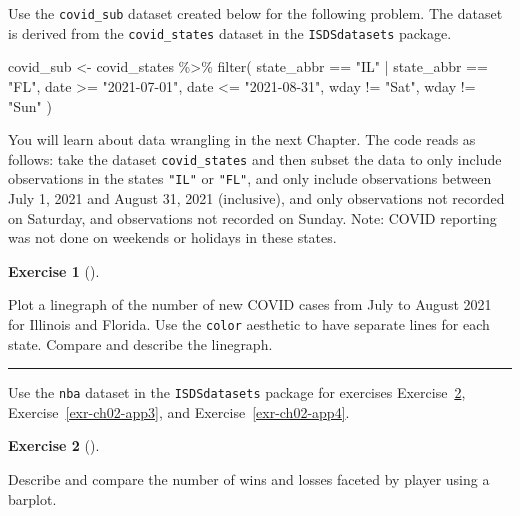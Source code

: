\documentclass[
  letterpaper,
  DIV=11,
  numbers=noendperiod]{scrreprt}
\newenvironment{Shaded}{\begin{snugshade}}{\end{snugshade}}
\newcommand{\FunctionTok}[1]{\textcolor[rgb]{0.28,0.35,0.67}{#1}}
\newcommand{\NormalTok}[1]{\textcolor[rgb]{0.00,0.23,0.31}{#1}}
\newcommand{\OtherTok}[1]{\textcolor[rgb]{0.00,0.23,0.31}{#1}}
\newcommand{\SpecialCharTok}[1]{\textcolor[rgb]{0.37,0.37,0.37}{#1}}
\newcommand{\StringTok}[1]{\textcolor[rgb]{0.13,0.47,0.30}{#1}}
\theoremstyle{definition}
\newtheorem{exercise}{Exercise}[chapter]
\theoremstyle{remark}
\begin{document}
Use the \texttt{covid\_sub} dataset created below for the following
problem. The dataset is derived from the \texttt{covid\_states} dataset
in the \texttt{ISDSdatasets} package.

\begin{Shaded}
\begin{Highlighting}[]
\NormalTok{covid\_sub }\OtherTok{\textless{}{-}}\NormalTok{ covid\_states }\SpecialCharTok{\%\textgreater{}\%} 
  \FunctionTok{filter}\NormalTok{(}
\NormalTok{    state\_abbr }\SpecialCharTok{==} \StringTok{"IL"} \SpecialCharTok{|}\NormalTok{ state\_abbr }\SpecialCharTok{==} \StringTok{"FL"}\NormalTok{,}
\NormalTok{    date }\SpecialCharTok{\textgreater{}=} \StringTok{"2021{-}07{-}01"}\NormalTok{, date }\SpecialCharTok{\textless{}=} \StringTok{"2021{-}08{-}31"}\NormalTok{,}
\NormalTok{    wday }\SpecialCharTok{!=} \StringTok{"Sat"}\NormalTok{, wday }\SpecialCharTok{!=} \StringTok{"Sun"}
\NormalTok{    )}
\end{Highlighting}
\end{Shaded}

You will learn about data wrangling in the next Chapter. The code reads
as follows: take the dataset \texttt{covid\_states} and then subset the
data to only include observations in the states \texttt{"IL"} or
\texttt{"FL"}, and only include observations between July 1, 2021 and
August 31, 2021 (inclusive), and only observations not recorded on
Saturday, and observations not recorded on Sunday. Note: COVID reporting
was not done on weekends or holidays in these states.

\begin{exercise}[]\protect\hypertarget{exr-ch02-app1}{}\label{exr-ch02-app1}

Plot a linegraph of the number of new COVID cases from July to August
2021 for Illinois and Florida. Use the \texttt{color} aesthetic to have
separate lines for each state. Compare and describe the linegraph.

\end{exercise}

\begin{center}\rule{0.5\linewidth}{0.5pt}\end{center}

Use the \texttt{nba} dataset in the \texttt{ISDSdatasets} package for
exercises Exercise~\ref{exr-ch02-app2}, Exercise~\ref{exr-ch02-app3},
and Exercise~\ref{exr-ch02-app4}.

\begin{exercise}[]\protect\hypertarget{exr-ch02-app2}{}\label{exr-ch02-app2}

Describe and compare the number of wins and losses faceted by player
using a barplot.

\end{exercise}
\end{document}
